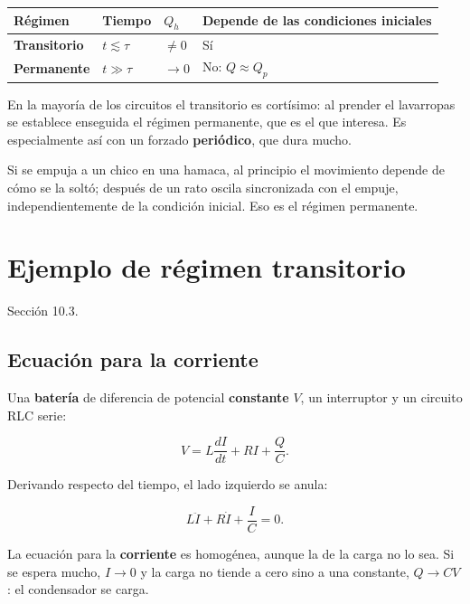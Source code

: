 \documentclass[12pt,a4paper]{article}
\begin{document}
\begin{center}
\renewcommand{\arraystretch}{1.35}
\small
\begin{tabularx}{\textwidth}{l>{\raggedright\arraybackslash}X>{\raggedright\arraybackslash}X>{\raggedright\arraybackslash}X}
\toprule
\textbf{Régimen} & \textbf{Tiempo} & \textbf{$Q_h$} & \textbf{Depende de las condiciones iniciales} \\
\midrule
\textbf{Transitorio} & $t\lesssim\tau$ & $\neq0$ & Sí \\
\textbf{Permanente} & $t\gg\tau$ & $\to0$ & No: $Q\approx Q_p$ \\
\bottomrule
\end{tabularx}
\end{center}

En la mayoría de los circuitos el transitorio es cortísimo: al prender el
lavarropas se establece enseguida el régimen permanente, que es el que interesa.
Es especialmente así con un forzado \textbf{periódico}, que dura mucho.

\begin{notebox}[La hamaca]
Si se empuja a un chico en una hamaca, al principio el
movimiento depende de cómo se la soltó; después de un rato oscila
sincronizada con el empuje, independientemente de la condición inicial. Eso
es el régimen permanente.
\end{notebox}

\section{Ejemplo de régimen transitorio}

Sección 10.3.

\subsection{Ecuación para la corriente}

Una \textbf{batería} de diferencia de potencial \textbf{constante} $V$, un interruptor y
un circuito RLC serie:

\[
V = L\frac{dI}{dt} + R I + \frac{Q}{C}.
\]

Derivando respecto del tiempo, el lado izquierdo se anula:

\[
L\ddot I + R\dot I + \frac{I}{C} = 0 .
\]

La ecuación para la \textbf{corriente} es homogénea, aunque la de la carga no lo
sea. Si se espera mucho, $I\to0$ y la carga no tiende a cero sino a una
constante, $Q\to CV$: el condensador se carga.
\end{document}
